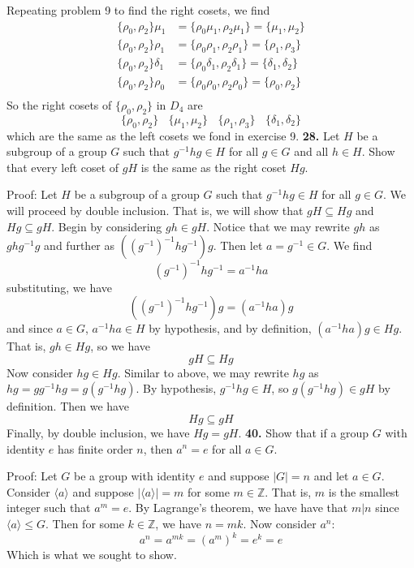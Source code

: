 \documentclass{article}
\begin{document}
Repeating problem 9 to find the right cosets, we find
\begin{align*}
    \{\rho_0, \rho_2\}\mu_1 &= \{\rho_0\mu_1, \rho_2\mu_1\} = \{\mu_1, \mu_2\} \\
    \{\rho_0, \rho_2\}\rho_1 &= \{\rho_0\rho_1, \rho_2\rho_1\} = \{\rho_1, \rho_3\} \\
    \{\rho_0, \rho_2\}\delta_1 &= \{\rho_0\delta_1, \rho_2\delta_1\} = \{\delta_1, \delta_2\} \\
    \{\rho_0, \rho_2\}\rho_0 &= \{\rho_0\rho_0, \rho_2\rho_0\} = \{\rho_0, \rho_2\} \\
\end{align*}
So the right cosets of $\{\rho_0, \rho_2\}$ in $D_4$ are
\[\{\rho_0, \rho_2\} \:\:\:\: \{\mu_1, \mu_2\} \:\:\:\: \{\rho_1, \rho_3\} \:\:\:\: \{\delta_1, \delta_2\}\]
which are the same as the left cosets we fond in exercise 9.
\newline\newline
\textbf{28.} Let $H$ be a subgroup of a group $G$ such that $g^{-1}hg \in H$ for all $g \in G$ and all $h \in H$. Show that every left coset of $gH$ is the same as the right coset $Hg$.
\newline

Proof: Let $H$ be a subgroup of a group $G$ such that $g^{-1}hg \in H$ for all $g \in G$. We will proceed by double inclusion. That is, we will show that $gH \subseteq Hg$ and $Hg \subseteq gH$. Begin by considering $gh \in gH$. Notice that we may rewrite $gh$ as $ghg^{-1}g$ and further as $((g^{-1})^{-1}hg^{-1})g$. Then let $a = g^{-1} \in G$. We find
\[(g^{-1})^{-1}hg^{-1} = a^{-1}ha\]
substituting, we have
\[((g^{-1})^{-1}hg^{-1})g = (a^{-1}ha)g\]
and since $a \in G$, $a^{-1}ha \in H$ by hypothesis, and by definition, $(a^{-1}ha)g \in Hg$. That is, $gh \in Hg$, so we have
\[gH \subseteq Hg\]
Now consider $hg \in Hg$. Similar to above, we may rewrite $hg$ as $hg = gg^{-1}hg = g(g^{-1}hg)$. By hypothesis, $g^{-1}hg \in H$, so $g(g^{-1}hg) \in gH$ by definition. Then we have
\[Hg \subseteq gH\]
Finally, by double inclusion, we have $Hg = gH$.
\newline\newline
\textbf{40.} Show that if a group $G$ with identity $e$ has finite order $n$, then $a^n = e$ for all $a \in G$.
\newline

Proof: Let $G$ be a group with identity $e$ and suppose $|G| = n$ and let $a \in G$. Consider $\langle a \rangle$ and suppose $|\langle a \rangle | = m$ for some $m \in \mathbb{Z}$. That is, $m$ is the smallest integer such that $a^m = e$. By Lagrange's theorem, we have have that $m \big| n$ since $\langle a \rangle \leq G$. Then for some $k \in \mathbb{Z}$, we have $n = mk$. Now consider $a^n$:
\[a^n = a^{mk} = (a^{m})^k = e^k = e\]
Which is what we sought to show.
\end{document}
